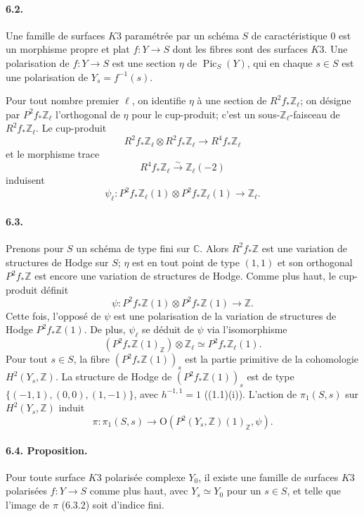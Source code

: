 \documentclass[10pt]{article}
\newcommand{\C}{\mathbb{C}}
\newcommand{\Z}{\mathbb{Z}}
\newcommand{\Pic}{\operatorname{Pic}}
\newcommand{\iso}{\xrightarrow{\sim}}
\begin{document}
\paragraph{6.2.} Une famille de surfaces $K3$ paramétrée par un schéma $S$ de caractéristique $0$ est un morphisme propre et plat $f:Y\to S$ dont les fibres sont des surfaces $K3$. Une polarisation de $f:Y\to S$ est une section $\eta$ de $\Pic_S(Y)$, qui en chaque $s\in S$ est une polarisation de $Y_s=f^{-1}(s)$.

Pour tout nombre premier $\ell$, on identifie $\eta$ à une section de $R^2f_*\Z_\ell$; on désigne par $P^2f_*\Z_\ell$ l'orthogonal de $\eta$ pour le cup-produit; c'est un sous-$\Z_\ell$-faisceau de $R^2f_*\Z_\ell$. Le cup-produit
\[
R^2f_*\Z_\ell\otimes R^2f_*\Z_\ell\longrightarrow R^4f_*\Z_\ell
\]
et le morphisme trace
\[
R^4f_*\Z_\ell\iso \Z_\ell(-2)
\]
induisent
\[
\tag{6.2.1}
\psi_\ell:P^2f_*\Z_\ell(1)\otimes P^2f_*\Z_\ell(1)\longrightarrow\Z_\ell.
\]

\paragraph{6.3.} Prenons pour $S$ un schéma de type fini sur $\C$. Alors $R^2f_*\Z$ est une variation de structures de Hodge sur $S$; $\eta$ est en tout point de type $(1,1)$ et son orthogonal $P^2f_*\Z$ est encore une variation de structures de Hodge. Comme plus haut, le cup-produit définit
\[
\tag{6.3.1}
\psi:P^2f_*\Z(1)\otimes P^2f_*\Z(1)\longrightarrow\Z.
\]
Cette fois, l'opposé de $\psi$ est une polarisation de la variation de structures de Hodge $P^2f_*\Z(1)$. De plus, $\psi_\ell$ se déduit de $\psi$ via l'isomorphisme
\[
(P^2f_*\Z(1)_\Z)\otimes\Z_\ell\simeq P^2f_*\Z_\ell(1).
\]
Pour tout $s\in S$, la fibre $(P^2f_*\Z(1))_s$ est la partie primitive de la cohomologie $H^2(Y_s,\Z)$. La structure de Hodge de $(P^2f_*\Z(1))_s$ est de type $\{(-1,1),(0,0),(1,-1)\}$, avec $h^{-1,1}=1$ ((1.1)(i)). L'action de $\pi_1(S,s)$ sur $H^2(Y_s,\Z)$ induit
\[
\tag{6.3.2}
\pi:\pi_1(S,s)\longrightarrow
\mathrm O(P^2(Y_s,\Z)(1)_\Z,\psi).
\]

\paragraph{6.4. Proposition.} Pour toute surface $K3$ polarisée complexe $Y_0$, il existe une famille de surfaces $K3$ polarisées $f:Y\to S$ comme plus haut, avec $Y_s\simeq Y_0$ pour un $s\in S$, et telle que l'image de $\pi$ (6.3.2) soit d'indice fini.
\end{document}
